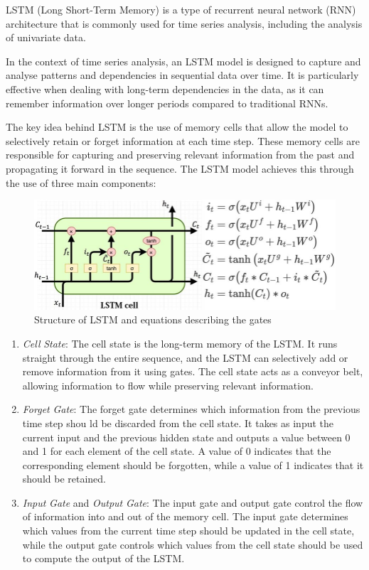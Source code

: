 \documentclass[
]{article}
\providecommand{\tightlist}{%
  \setlength{\itemsep}{0pt}\setlength{\parskip}{0pt}}
\begin{document}
LSTM (Long Short-Term Memory) is a type of recurrent neural network
(RNN) architecture that is commonly used for time series analysis,
including the analysis of univariate data.

In the context of time series analysis, an LSTM model is designed to
capture and analyse patterns and dependencies in sequential data over
time. It is particularly effective when dealing with long-term
dependencies in the data, as it can remember information over longer
periods compared to traditional RNNs.

The key idea behind LSTM is the use of memory cells that allow the model
to selectively retain or forget information at each time step. These
memory cells are responsible for capturing and preserving relevant
information from the past and propagating it forward in the sequence.
The LSTM model achieves this through the use of three main components:

\begin{figure}
\centering
\includegraphics{Plots/image1.png}
\caption{Structure of LSTM and equations describing the gates}
\end{figure}

\begin{enumerate}
\def\labelenumi{\arabic{enumi}.}
\tightlist
\item
  \emph{Cell} \emph{State}: The cell state is the long-term memory of
  the LSTM. It runs straight through the entire sequence, and the LSTM
  can selectively add or remove information from it using gates. The
  cell state acts as a conveyor belt, allowing information to flow while
  preserving relevant information.
\item
  \emph{Forget} \emph{Gate}: The forget gate determines which
  information from the previous time step shou ld be discarded from the
  cell state. It takes as input the current input and the previous
  hidden state and outputs a value between 0 and 1 for each element of
  the cell state. A value of 0 indicates that the corresponding element
  should be forgotten, while a value of 1 indicates that it should be
  retained.
\item
  \emph{Input} \emph{Gate} and \emph{Output} \emph{Gate}: The input gate
  and output gate control the flow of information into and out of the
  memory cell. The input gate determines which values from the current
  time step should be updated in the cell state, while the output gate
  controls which values from the cell state should be used to compute
  the output of the LSTM.
\end{enumerate}
\end{document}
